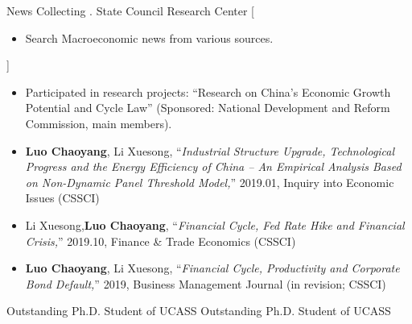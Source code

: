 \documentclass{resume}
\begin{document}
\begin{experiences}
    {News Collecting \@. State Council Research Center}%
    [\begin{itemize}
      \item Search Macroeconomic news from various sources.
    \end{itemize}]%

\end{experiences}

\begin{itemize}
  \small
  \item Participated in research projects:
    \enquote{Research on China's Economic Growth Potential and Cycle Law} (Sponsored: National Development and Reform Commission, main members).
  \item \textbf{Luo Chaoyang}, Li Xuesong,
    \enquote{\it Industrial Structure Upgrade, Technological Progress and the Energy Efficiency of China -- An Empirical Analysis Based on Non-Dynamic Panel Threshold Model,}
    2019.01, Inquiry into Economic Issues (CSSCI)
  \item Li Xuesong,\textbf{Luo Chaoyang},
    \enquote{\it Financial Cycle, Fed Rate Hike and Financial Crisis,}
    2019.10, Finance \& Trade Economics (CSSCI)
  \item \textbf{Luo Chaoyang}, Li Xuesong,
    \enquote{\it Financial Cycle, Productivity and Corporate Bond Default,}
    2019, Business Management Journal (in revision; CSSCI)
\end{itemize}

\begin{entries}
    {Outstanding Ph.D. Student of UCASS}
    {Outstanding Ph.D. Student of UCASS}
\end{entries}
\end{document}
